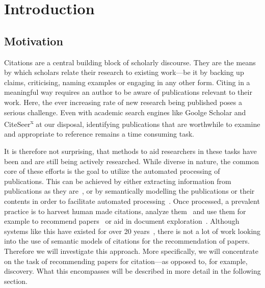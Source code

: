 \chapter{Introduction}\label{chap:introduction}
\section{Motivation}
Citations are a central building block of scholarly discourse. They are the means by which scholars relate their research to existing work---be it by backing up claims, criticising, naming examples or engaging in any other form. Citing in a meaningful way requires an author to be aware of publications relevant to their work.
Here, the ever increasing rate of new research being published poses a serious challenge. Even with academic search engines like Goolge Scholar and CiteSeer\textsuperscript{x} at our disposal, identifying publications that are worthwhile to examine and appropriate to reference remains a time consuming task.

It is therefore not surprising, that methods to aid researchers in these tasks have been and are still being actively researched. While diverse in nature, the common core of these efforts is the goal to utilize the automated processing of publications. This can be achieved by either extracting information from publications as they are~\cite{Nasar2018,Beel2016}, or by semantically modelling the publications or their contents in order to facilitate automated processing~\cite{BuckinghamShum2000,Peroni2012,Huh2014,Jaradeh2019}. %
Once processed, a prevalent practice is to harvest human made citations, analyze them~\cite{Abujbara2013,Teufel2006a} and use them for example to recommend papers~\cite{Beel2016} or aid in document exploration~\cite{Berger2016}. Although systems like this have existed for over 20 years~\cite{Bollacker1998,Beel2016}, there is not a lot of work looking into the use of semantic models of citations for the recommendation of papers.
Therefore we will investigate this approach. More specifically, we will concentrate on the task of recommending papers for citation---as opposed to, for example, discovery. What this encompasses will be described in more detail in the following section.

